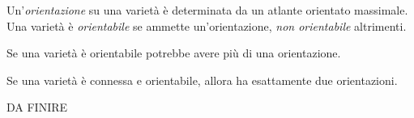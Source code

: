 \begin{defn}
Un'\emph{orientazione} su una varietà è determinata da un atlante orientato massimale. Una varietà è \emph{orientabile} se ammette un'orientazione, \emph{non orientabile} altrimenti.
\end{defn}

\begin{oss}
Se una varietà è orientabile potrebbe avere più di una orientazione.
\end{oss}

\begin{prop}
Se una varietà è connessa e orientabile, allora ha esattamente due orientazioni.
\end{prop}

DA FINIRE


